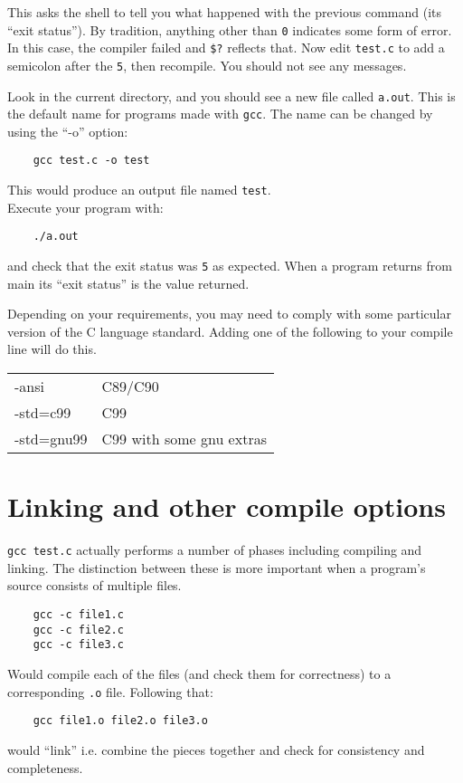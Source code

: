 This asks the shell to tell you what happened with the previous command (its ``exit status'').
By tradition, anything other than \texttt{0} indicates some form of error.
In this case, the compiler failed and \texttt{\$?} reflects that.
Now edit \texttt{test.c} to add a semicolon after the \texttt{5}, then recompile.
You should not see any messages.

Look in the current directory, and you should see a new file called \texttt{a.out}.
This is the default name for programs made with \texttt{gcc}. The name can be changed
by using the ``-o'' option:

\begin{verbatim}
    gcc test.c -o test
\end{verbatim}
This would produce an output file named \texttt{test}.
\\
Execute your program with:
\begin{verbatim}
    ./a.out 
\end{verbatim}
and check that the exit status was \texttt{5} as expected. When a program returns from main its ``exit status'' is the value returned.

Depending on your requirements, you may need to comply with some particular version of the C language standard.
Adding one of the following to your compile line will do this.\\

\begin{tabular}{l|l}
-ansi & C89/C90 \\
-std=c99 & C99 \\
-std=gnu99 & C99 with some gnu extras\\
\end{tabular}


\section{Linking and other compile options}
\texttt{gcc test.c} actually performs a number of phases including compiling and linking.
The distinction between these is more important when a program's source consists of multiple 
files.
\begin{verbatim}
    gcc -c file1.c
    gcc -c file2.c
    gcc -c file3.c
\end{verbatim}
Would compile each of the files (and check them for correctness) to a corresponding \texttt{.o} file.
Following that:
\begin{verbatim}
    gcc file1.o file2.o file3.o 
\end{verbatim}
would ``link'' i.e. combine the pieces together and check for consistency and completeness.

